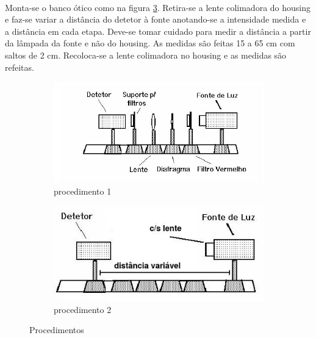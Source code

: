 \documentclass[a4paper,11pt]{article}
\begin{document}
\paragraph{}Monta-se o banco ótico como na figura \ref{fig:proced-2}. Retira-se a lente colimadora do housing e faz-se variar a distância do detetor à fonte anotando-se a intensidade medida e a distância em cada etapa. Deve-se tomar cuidado para medir a distância a partir da lâmpada da fonte e não do housing. As medidas são feitas 15 a 65 cm com saltos de 2 cm. Recoloca-se a lente colimadora no housing e as medidas são refeitas.
\FloatBarrier
\begin{figure}[!htp]
\hspace{-1 cm}
	\begin{subfigure}[!htp]{0.5\textwidth}
		\includegraphics[scale= 0.6]{./fig:proced-montagem1.jpeg}
		\caption{procedimento 1}
		\label{fig:proced-1}
	\end{subfigure}
\hspace{2 cm}
	\begin{subfigure}[!htp]{0.5\textwidth}
		\includegraphics[scale= 0.6]{./fig:proced-montagem2.jpeg}
		\caption{procedimento 2}
		\label{fig:proced-2}
	\end{subfigure}

\caption{Procedimentos}
\end{figure}
\FloatBarrier
\end{document}
